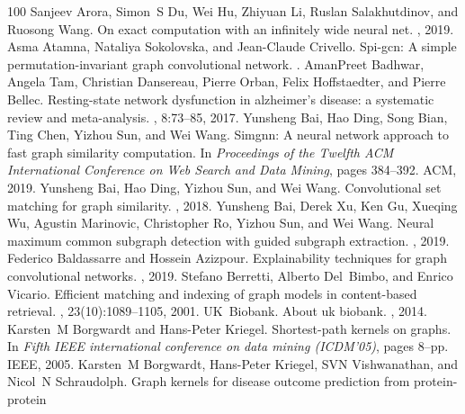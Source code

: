 \begin{thebibliography}{100}
Sanjeev Arora, Simon~S Du, Wei Hu, Zhiyuan Li, Ruslan Salakhutdinov, and
  Ruosong Wang.
\newblock On exact computation with an infinitely wide neural net.
, 2019.
Asma Atamna, Nataliya Sokolovska, and Jean-Claude Crivello.
\newblock Spi-gcn: A simple permutation-invariant graph convolutional network.
.
AmanPreet Badhwar, Angela Tam, Christian Dansereau, Pierre Orban, Felix
  Hoffstaedter, and Pierre Bellec.
\newblock Resting-state network dysfunction in alzheimer's disease: a
  systematic review and meta-analysis.
, 8:73--85, 2017.
Yunsheng Bai, Hao Ding, Song Bian, Ting Chen, Yizhou Sun, and Wei Wang.
\newblock Simgnn: A neural network approach to fast graph similarity
  computation.
\newblock In {\em Proceedings of the Twelfth ACM International Conference on
  Web Search and Data Mining}, pages 384--392. ACM, 2019.
Yunsheng Bai, Hao Ding, Yizhou Sun, and Wei Wang.
\newblock Convolutional set matching for graph similarity.
, 2018.
Yunsheng Bai, Derek Xu, Ken Gu, Xueqing Wu, Agustin Marinovic, Christopher Ro,
  Yizhou Sun, and Wei Wang.
\newblock Neural maximum common subgraph detection with guided subgraph
  extraction.
, 2019.
Federico Baldassarre and Hossein Azizpour.
\newblock Explainability techniques for graph convolutional networks.
, 2019.
Stefano Berretti, Alberto Del~Bimbo, and Enrico Vicario.
\newblock Efficient matching and indexing of graph models in content-based
  retrieval.
,
  23(10):1089--1105, 2001.
UK~Biobank.
\newblock About uk biobank.
,
  2014.
Karsten~M Borgwardt and Hans-Peter Kriegel.
\newblock Shortest-path kernels on graphs.
\newblock In {\em Fifth IEEE international conference on data mining
  (ICDM'05)}, pages 8--pp. IEEE, 2005.
Karsten~M Borgwardt, Hans-Peter Kriegel, SVN Vishwanathan, and Nicol~N
  Schraudolph.
\newblock Graph kernels for disease outcome prediction from protein-protein

\end{thebibliography}
